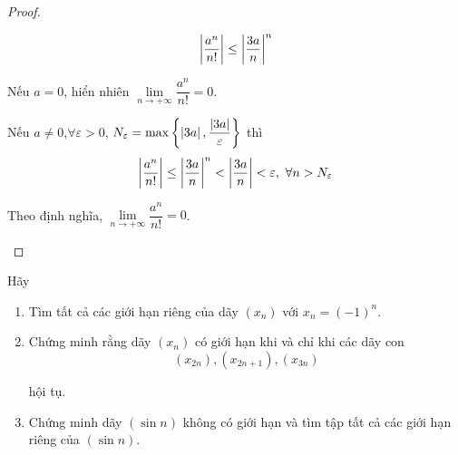 \documentclass[class=analysis,crop=false]{standalone}
\begin{document}
\begin{proof}
\begin{enumerate}[label = (\roman*)]
            \[
                \left\vert{\dfrac{a^{n}}{n!}}\right\vert \le \left\vert{\dfrac{3a}{n}}\right\vert^{n}
            \]
            \par Nếu $a = 0$, hiển nhiên $\lim\limits_{n\to+\infty}\dfrac{a^{n}}{n!} = 0$.
            \par Nếu $a\ne 0$,$\forall\varepsilon > 0$, $N_{\varepsilon} = \max\left\{ \left\vert{3a}\right\vert, \dfrac{\left\vert{3a}\right\vert}{\varepsilon} \right\}$ thì
            \[
                \abs{\dfrac{a^{n}}{n!}} \le \abs{\dfrac{3a}{n}}^{n} < \abs{\dfrac{3a}{n}} < \varepsilon,\ \forall n > N_{\varepsilon}
            \]
            \par Theo định nghĩa, $\lim\limits_{n\to+\infty}\dfrac{a^{n}}{n!} = 0$.
    \end{enumerate}
\end{proof}

\begin{exercise}
    \par Hãy
    \begin{enumerate}[label = (\roman*)]
        \item Tìm tất cả các giới hạn riêng của dãy $(x_{n})$ với $x_{n} = (-1)^{n}$.
        \item Chứng minh rằng dãy $(x_{n})$ có giới hạn khi và chỉ khi các dãy con
            \[ (x_{2n}), (x_{2n+1}), (x_{3n}) \]
            \par hội tụ.
        \item Chứng minh dãy $(\sin n)$ không có giới hạn và tìm tập tất cả các giới hạn riêng của $(\sin n)$.
    \end{enumerate}
\end{exercise}
\end{document}
